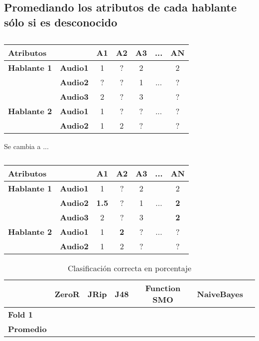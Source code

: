 \subsection{Promediando los atributos de cada hablante sólo si es desconocido}

\begin{table}[H]
	\centering
	\begin{tabular}{|l|l|ccccc|}
		\hline
		\multicolumn{2}{|l|}{Atributos} & A1 & A2 & A3 & ... & AN \\
		\hline 
		\textbf{Hablante 1} & \textbf{Audio1} & 1 & ? & 2 & & 2\\
		& \textbf{Audio2} & ? & ? & 1 & ... & ? \\
		& \textbf{Audio3} & 2 & ? & 3 & & ? \\
		\hline
		\textbf{Hablante 2} & \textbf{Audio1} & 1 & ? & ? & ... & ? \\
		& \textbf{Audio2} & 1 & 2 & ? & & ? \\
		\hline
	\end{tabular}
	\caption{}
	\label{}
\end{table}

Se cambia a ...

\begin{table}[H]
	\centering
	\begin{tabular}{|l|l|ccccc|}
		\hline
		\multicolumn{2}{|l|}{Atributos} & A1 & A2 & A3 & ... & AN \\
		\hline 
		\textbf{Hablante 1} & \textbf{Audio1} & 1 & ? & 2 & & 2\\
		& \textbf{Audio2} & \textbf{1.5} & ? & 1 & ... & \textbf{2} \\
		& \textbf{Audio3} & 2 & ? & 3 & & \textbf{2} \\
		\hline
		\textbf{Hablante 2} & \textbf{Audio1} & 1 & \textbf{2} & ? & ... & ? \\
		& \textbf{Audio2} & 1 & 2 & ? & & ? \\
		\hline
	\end{tabular}
	\caption{}
	\label{}
\end{table}

\begin{table}[H]
	\centering
	\begin{tabular}{|l|c|c|c|c|c|c|}
		\hline
		\textbf{}  & \textbf{ZeroR} & \textbf{JRip} & \textbf{J48} & \textbf{Function SMO} & \textbf{NaiveBayes} \\ \hline
		\textbf{Fold 1}  &  &  &  &  &  \\ \hline
		\hline \hline
		\textbf{Promedio} &  &  &  &  &  \\ \hline
	\end{tabular}
	\caption{Clasificación correcta en porcentaje}
	\label{class_corr_en_pct}
\end{table}

